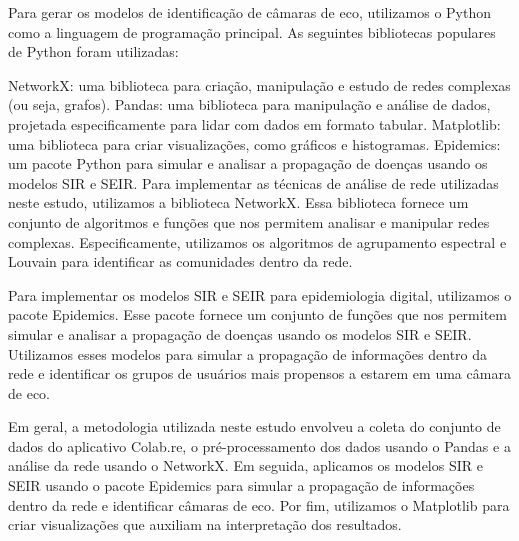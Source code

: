 Para gerar os modelos de identificação de câmaras de eco, utilizamos o Python como a linguagem de programação principal. As seguintes bibliotecas populares de Python foram utilizadas:

NetworkX: uma biblioteca para criação, manipulação e estudo de redes complexas (ou seja, grafos).
Pandas: uma biblioteca para manipulação e análise de dados, projetada especificamente para lidar com dados em formato tabular.
Matplotlib: uma biblioteca para criar visualizações, como gráficos e histogramas.
Epidemics: um pacote Python para simular e analisar a propagação de doenças usando os modelos SIR e SEIR.
Para implementar as técnicas de análise de rede utilizadas neste estudo, utilizamos a biblioteca NetworkX. Essa biblioteca fornece um conjunto de algoritmos e funções que nos permitem analisar e manipular redes complexas. Especificamente, utilizamos os algoritmos de agrupamento espectral e Louvain para identificar as comunidades dentro da rede.

Para implementar os modelos SIR e SEIR para epidemiologia digital, utilizamos o pacote Epidemics. Esse pacote fornece um conjunto de funções que nos permitem simular e analisar a propagação de doenças usando os modelos SIR e SEIR. Utilizamos esses modelos para simular a propagação de informações dentro da rede e identificar os grupos de usuários mais propensos a estarem em uma câmara de eco.

Em geral, a metodologia utilizada neste estudo envolveu a coleta do conjunto de dados do aplicativo Colab.re, o pré-processamento dos dados usando o Pandas e a análise da rede usando o NetworkX. Em seguida, aplicamos os modelos SIR e SEIR usando o pacote Epidemics para simular a propagação de informações dentro da rede e identificar câmaras de eco. Por fim, utilizamos o Matplotlib para criar visualizações que auxiliam na interpretação dos resultados.
